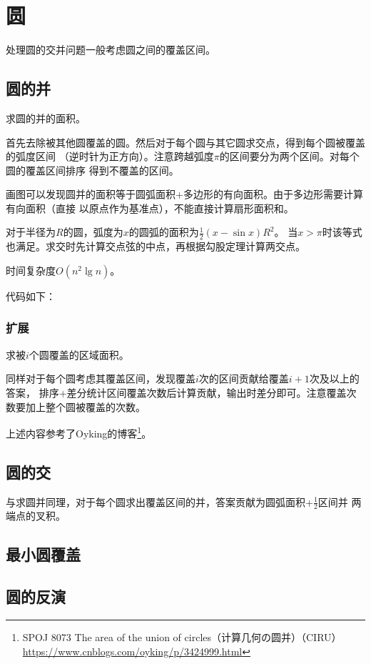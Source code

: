 \section{圆}
处理圆的交并问题一般考虑圆之间的覆盖区间。
\subsection{圆的并}
求圆的并的面积。

首先去除被其他圆覆盖的圆。然后对于每个圆与其它圆求交点，得到每个圆被覆盖的弧度区间
（逆时针为正方向）。注意跨越弧度$\pi$的区间要分为两个区间。对每个圆的覆盖区间排序
得到不覆盖的区间。

画图可以发现圆并的面积等于圆弧面积+多边形的有向面积。由于多边形需要计算有向面积（直接
以原点作为基准点），不能直接计算扇形面积和。

对于半径为$R$的圆，弧度为$x$的圆弧的面积为$\frac{1}{2}(x-\sin x)R^2$。
当$x> \pi$时该等式也满足。求交时先计算交点弦的中点，再根据勾股定理计算两交点。

时间复杂度$O(n^2 \lg n)$。

代码如下：


\subsubsection{扩展}
求被$i$个圆覆盖的区域面积。

同样对于每个圆考虑其覆盖区间，发现覆盖$i$次的区间贡献给覆盖$i+1$次及以上的答案，
排序+差分统计区间覆盖次数后计算贡献，输出时差分即可。注意覆盖次数要加上整个圆被覆盖的次数。



上述内容参考了Oyking的博客\footnote{
	SPOJ 8073 The area of the union of circles（计算几何の圆并）（CIRU）
	\url{https://www.cnblogs.com/oyking/p/3424999.html}
}。
\subsection{圆的交}
与求圆并同理，对于每个圆求出覆盖区间的并，答案贡献为圆弧面积+$\frac{1}{2}$区间并
两端点的叉积。
\subsection{最小圆覆盖}
\subsection{圆的反演}
